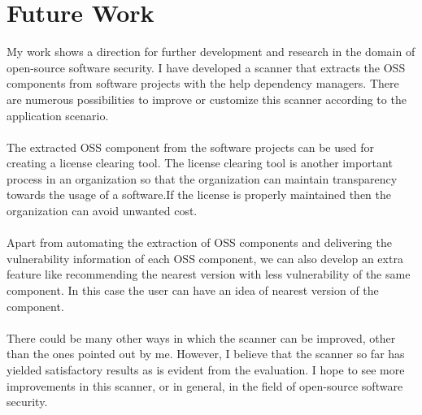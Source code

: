 %
\section{Future Work}\label{sec:future_work}
%
My work shows a direction for further development and research in the domain of open-source software security. I have developed a scanner that extracts the \acs{OSS} components from software projects with the help dependency managers. There are numerous
possibilities to improve or customize this scanner according to the application scenario.
\paragraph{}
The extracted \acs{OSS} component from the software projects can be used for creating a license clearing tool. The license clearing tool is another important process in an organization so that the organization can maintain transparency towards the usage of a software.If the license is properly maintained then the organization can avoid unwanted cost.
\paragraph{}
Apart from automating the extraction of \acs{OSS} components and delivering the vulnerability information of each \acs{OSS} component, we can also develop an extra feature like recommending the nearest version with less vulnerability of the same component. In this case the user can have an idea of nearest version of the component.
\paragraph{}

There could be many other ways in which the scanner can be improved, other than the ones pointed out by me. However, I believe that the scanner so far has yielded satisfactory results as is evident from the evaluation. I hope to see more improvements in this scanner, or in general, in the field of open-source software security.
%
